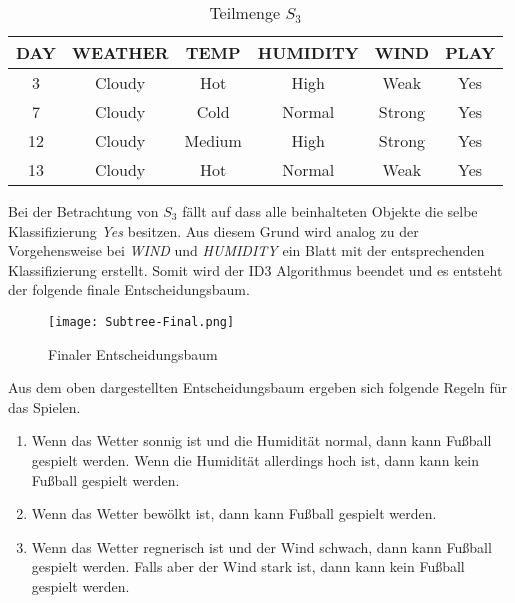 \begin{table}[htbp]
    \centering
    \begin{tabular}{cccccc}
        \toprule
        \textbf{DAY} & \textbf{WEATHER} & \textbf{TEMP} & \textbf{HUMIDITY} & \textbf{WIND} & \textbf{PLAY} \\
        \toprule
        3   &Cloudy	&Hot	&High	&Weak	&Yes \\
        7   &Cloudy	&Cold	&Normal	&Strong	&Yes \\
        12  &Cloudy	&Medium	&High	&Strong	&Yes \\
        13  &Cloudy	&Hot	&Normal	&Weak	&Yes \\
        \bottomrule
    \end{tabular}
    \caption{Teilmenge $S_{3}$}
    \label{table:datensatz-cloudy}
\end{table}

Bei der Betrachtung von $S_{3}$ fällt auf dass alle beinhalteten Objekte die selbe Klassifizierung \textit{Yes} besitzen. Aus diesem Grund wird analog zu der Vorgehensweise bei \textit{WIND} und \textit{HUMIDITY} ein Blatt mit der entsprechenden Klassifizierung erstellt. Somit wird der ID3 Algorithmus beendet und es entsteht der folgende finale Entscheidungsbaum.

\begin{figure}[H]
    \centering
    \texttt{[image: Subtree-Final.png]}
    \caption{Finaler Entscheidungsbaum}
\end{figure}

Aus dem oben dargestellten Entscheidungsbaum ergeben sich folgende Regeln für das Spielen. 

\begin{enumerate}
    \item Wenn das Wetter sonnig ist und die Humidität normal, dann kann Fußball gespielt werden. Wenn die Humidität allerdings hoch ist, dann kann kein Fußball gespielt werden. \autocite{ImplementationID3}
    \item Wenn das Wetter bewölkt ist, dann kann Fußball gespielt werden. \autocite{ImplementationID3}
    \item Wenn das Wetter regnerisch ist und der Wind schwach, dann kann Fußball gespielt werden. Falls aber der Wind stark ist, dann kann kein Fußball gespielt werden. \autocite{ImplementationID3}
\end{enumerate}

\pagebreak